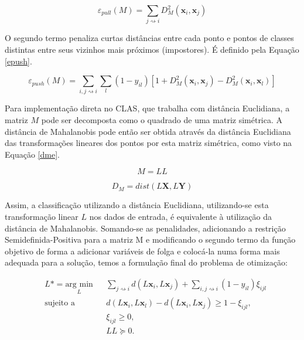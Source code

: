 \documentclass[
	12pt,				%
	openright,			%
	twoside,			%
	a4paper,			%
	english,			%
	spanish,			%
	brazil,				%
	]{abntex2}\usepackage[]{graphicx}\usepackage[]{color}
\begin{document}
\begin{equation}
\varepsilon _{pull}(M) = \sum_{j \rightsquigarrow i}D_{M}^2(\mathbf{x}_i,\mathbf{x}_j)
\label{epull}
\end{equation}

O segundo termo penaliza curtas distâncias entre cada ponto e pontos de classes distintas entre seus vizinhos mais próximos (impostores). É definido pela Equação \ref{epush}.

\begin{equation}
\varepsilon _{push}(M) = \sum_{i,j \rightsquigarrow i}\sum_{l}(1 - y_{il})[1+D_{M}^2(\mathbf{x}_i,\mathbf{x}_j) - D_{M}^2(\mathbf{x}_i,\mathbf{x}_l)]
\label{epush}
\end{equation}

Para implementação direta no CLAS, que trabalha com distância Euclidiana, a matriz $M$ pode ser decomposta como o quadrado de uma matriz simétrica. A distância de Mahalanobis pode então ser obtida através da distância Euclidiana das transformações lineares dos pontos por esta matriz simétrica, como visto na Equação \ref{dme}.

\begin{equation}
M = LL
\label{mll}
\end{equation}

\begin{equation}
D_{M} = dist(L\mathbf{X},L\mathbf{Y})
\label{dme}
\end{equation}

Assim, a classificação utilizando a distância Euclidiana, utilizando-se esta transformação linear $L$ nos dados de entrada, é equivalente à utilização da distância de Mahalanobis. Somando-se as penalidades, adicionando a restrição Semidefinida-Positiva para a matriz M e modificando o segundo termo da função objetivo de forma a adicionar variáveis de folga e colocá-la numa forma mais adequada para a solução, temos a formulação final do problema de otimização:

\begin{equation}
\begin{aligned}
& L* = \underset{L}{\text{arg min}}
& & \sum_{j \rightsquigarrow i}d(L\mathbf{x}_i,L\mathbf{x}_j)+\sum_{i,j \rightsquigarrow i}(1 - y_{il}) \xi_{ijl}\\
& \text{sujeito a}
& & d(L\mathbf{x}_i,L\mathbf{x}_l) - d(L\mathbf{x}_i,L\mathbf{x}_j) \geq 1 - \xi_{ijl},\\
&&& \xi_{ijl} \geq 0,\\
&&& LL\succeq 0.
\end{aligned}
\label{fobj}
\end{equation}
\end{document}
